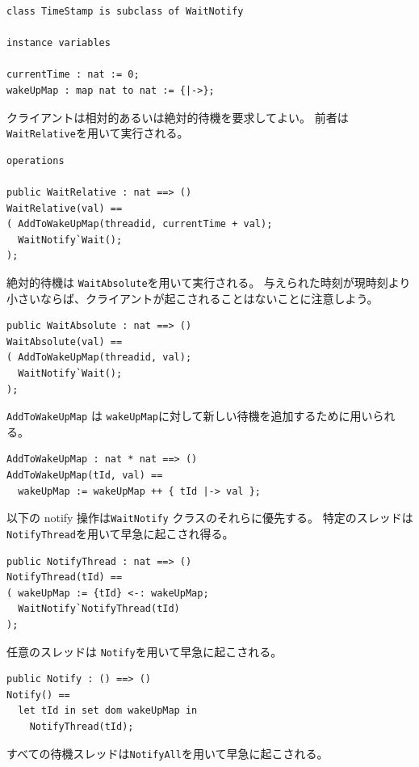 \documentclass[\pformat,12pt]{jreport}
\begin{document}
\begin{lstlisting}
class TimeStamp is subclass of WaitNotify

instance variables
  
currentTime : nat := 0;
wakeUpMap : map nat to nat := {|->};
\end{lstlisting}

クライアントは相対的あるいは絶対的待機を要求してよい。
前者は \texttt{WaitRelative}を用いて実行される。

\begin{lstlisting}
operations

public WaitRelative : nat ==> ()
WaitRelative(val) ==
( AddToWakeUpMap(threadid, currentTime + val);
  WaitNotify`Wait();
);
\end{lstlisting}

絶対的待機は \texttt{WaitAbsolute}を用いて実行される。 
与えられた時刻が現時刻より小さいならば、クライアントが起こされることはないことに注意しよう。

\begin{lstlisting}
public WaitAbsolute : nat ==> ()
WaitAbsolute(val) ==
( AddToWakeUpMap(threadid, val);
  WaitNotify`Wait();
);
\end{lstlisting}

\texttt{AddToWakeUpMap} は \texttt{wakeUpMap}に対して新しい待機を追加するために用いられる。

\begin{lstlisting}
AddToWakeUpMap : nat * nat ==> ()
AddToWakeUpMap(tId, val) ==
  wakeUpMap := wakeUpMap ++ { tId |-> val };
\end{lstlisting}

以下の notify 操作は\texttt{WaitNotify} クラスのそれらに優先する。
特定のスレッドは \texttt{NotifyThread}を用いて早急に起こされ得る。

\begin{lstlisting}
public NotifyThread : nat ==> ()
NotifyThread(tId) ==
( wakeUpMap := {tId} <-: wakeUpMap;
  WaitNotify`NotifyThread(tId)
);
\end{lstlisting}

任意のスレッドは \texttt{Notify}を用いて早急に起こされる。

\begin{lstlisting}
public Notify : () ==> ()
Notify() ==
  let tId in set dom wakeUpMap in
    NotifyThread(tId);
\end{lstlisting}

すべての待機スレッドは\texttt{NotifyAll}を用いて早急に起こされる。
\end{document}
